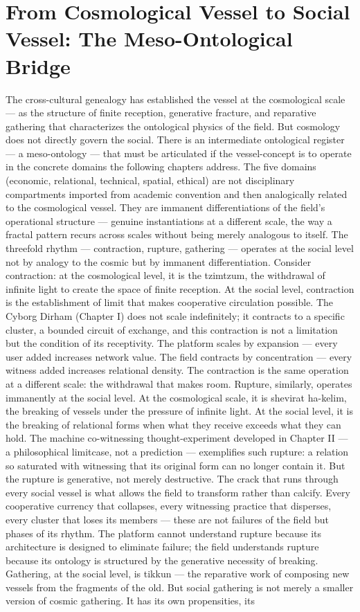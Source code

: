 \section{From Cosmological Vessel to Social Vessel: The Meso-Ontological Bridge}

The cross-cultural genealogy has established the vessel at the cosmological scale — as the structure of finite reception, generative fracture, and reparative gathering that characterizes the ontological physics of the field. But cosmology does not directly govern the social. There is an intermediate ontological register — a meso-ontology — that must be articulated if the vessel-concept is to operate in the concrete domains the following chapters address. The five domains (economic, relational, technical, spatial, ethical) are not disciplinary compartments imported from academic convention and then analogically related to the cosmological vessel. They are immanent differentiations of the field’s operational structure — genuine instantiations at a different scale, the way a fractal pattern recurs across scales without being merely analogous to itself. The threefold rhythm — contraction, rupture, gathering — operates at the social level not by analogy to the cosmic but by immanent differentiation. Consider contraction: at the cosmological level, it is the tzimtzum, the withdrawal of infinite light to create the space of finite reception. At the social level, contraction is the establishment of limit that makes cooperative circulation possible. The Cyborg Dirham (Chapter I) does not scale indefinitely; it contracts to a specific cluster, a bounded circuit of exchange, and this contraction is not a limitation but the condition of its receptivity. The platform scales by expansion — every user added increases network value. The field contracts by concentration — every witness added increases relational density. The contraction is the same operation at a different scale: the withdrawal that makes room. Rupture, similarly, operates immanently at the social level. At the cosmological scale, it is shevirat ha-kelim, the breaking of vessels under the pressure of infinite light. At the social level, it is the breaking of relational forms when what they receive exceeds what they can hold. The machine co-witnessing thought-experiment developed in Chapter II — a philosophical limitcase, not a prediction — exemplifies such rupture: a relation so saturated with witnessing that its original form can no longer contain it. But the rupture is generative, not merely destructive. The crack that runs through every social vessel is what allows the field to transform rather than calcify. Every cooperative currency that collapses, every witnessing practice that disperses, every cluster that loses its members --- these are not failures of the field but phases of its rhythm. The platform cannot understand rupture because its architecture is designed to eliminate failure; the field understands rupture because its ontology is structured by the generative necessity of breaking. Gathering, at the social level, is tikkun — the reparative work of composing new vessels from the fragments of the old. But social gathering is not merely a smaller version of cosmic gathering. It has its own propensities, its 